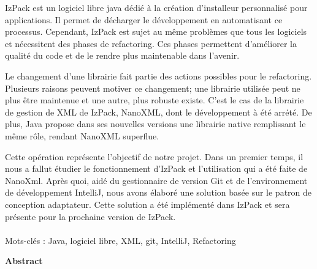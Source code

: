 IzPack est un logiciel libre java dédié à la création d'installeur personnalisé pour applications.
Il permet de décharger le développement en automatisant ce processus.
Cependant, IzPack est sujet au même problèmes que tous les logiciels et nécessitent des phases de refactoring.
Ces phases permettent d'améliorer la qualité du code et de le rendre plus maintenable dans l'avenir.

Le changement d'une librairie fait partie des actions possibles pour le refactoring.
Plusieurs raisons peuvent motiver ce changement; une librairie utilisée peut ne plus être maintenue et une autre, plus robuste existe.
C'est le cas de la librairie de gestion de XML de IzPack, NanoXML, dont le développement à été arrété. 
De plus, Java propose dans ses nouvelles versions une librairie native remplissant le même rôle, rendant NanoXML superflue.

Cette opération représente l'objectif de notre projet. 
Dans un premier temps, il nous a fallut étudier le fonctionnement d'IzPack et l'utilisation qui a été faite de NanoXml.
Après quoi, aidé du gestionnaire de version Git et de l'environnement de développement IntelliJ, nous avons élaboré une solution basée sur le patron de conception adaptateur.
Cette solution a été implémenté dans IzPack et sera présente pour la prochaine version de IzPack.
~\\
~\\
Mots-clés : Java, logiciel libre, XML, git, IntelliJ, Refactoring
\vfill
\begin{center}\large{\textbf{Abstract}}\end{center}

% 

